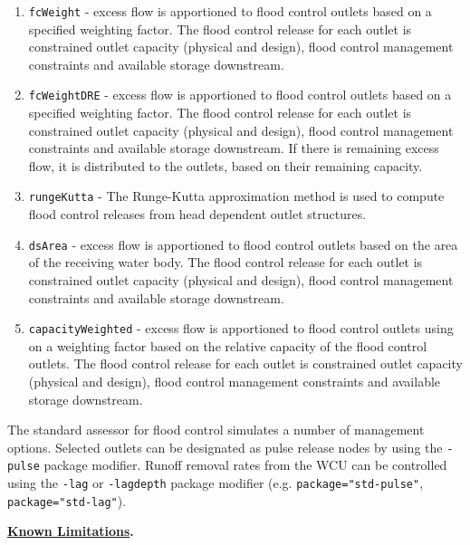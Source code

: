\begin{enumerate}
\begin{enumerate}
  \item {\tt fcWeight} \-- excess flow is apportioned to flood control
    outlets based on a specified weighting factor.  The flood control
    release for each outlet is constrained outlet capacity (physical
    and design), flood control management constraints and available
    storage downstream.

  \item {\tt fcWeightDRE} \-- excess flow is apportioned to flood control
    outlets based on a specified weighting factor.  The flood control
    release for each outlet is constrained outlet capacity (physical
    and design), flood control management constraints and available
    storage downstream.  If there is remaining excess flow, it is
    distributed to the outlets, based on their remaining capacity.

  \item {\tt rungeKutta} \-- The Runge\--Kutta approximation method is
    used to compute flood control releases from head dependent outlet
    structures.  

  \item {\tt dsArea} - excess flow is apportioned to flood control outlets
    based on the area of the receiving water body.  The flood control
    release for each outlet is constrained outlet capacity (physical
    and design), flood control management constraints and available
    storage downstream.

  \item {\tt capacityWeighted} \-- excess flow is apportioned to flood
    control outlets using on a weighting factor based on the relative
    capacity of the flood control outlets.  The flood control release
    for each outlet is constrained outlet capacity (physical and
    design), flood control management constraints and available
    storage downstream.

 \end{enumerate}

\end{enumerate}

The standard assessor for flood control simulates a number of
management options.  Selected outlets can be designated as pulse
release nodes by using the {\tt -pulse} package modifier.  Runoff
removal rates from the WCU can be controlled using the {\tt -lag} or
{\tt -lagdepth} package modifier (e.g. {\tt package="std-pulse"}, {\tt
  package="std-lag"}).

\textbf{\underline{Known Limitations}.}  

